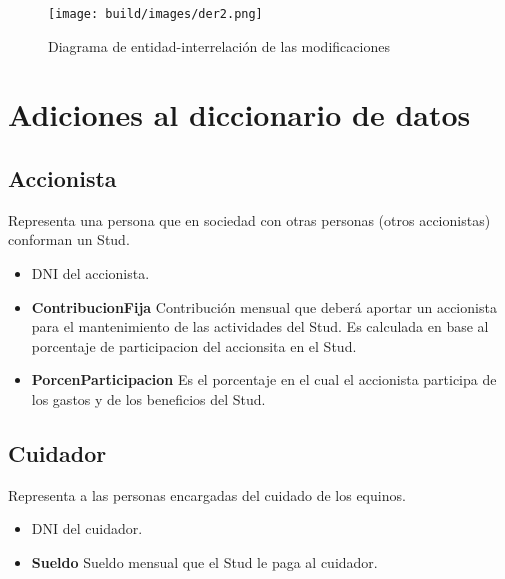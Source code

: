 \documentclass[a4paper,11pt]{article}
\begin{document}
\begin{figure}[h!t]
  \centering
  \texttt{[image: build/images/der2.png]}
  \caption{Diagrama de entidad-interrelación de las modificaciones} \label{fig:der2}
\end{figure}

\FloatBarrier

\section{Adiciones al diccionario de datos}

\subsection{Accionista}

Representa una persona que en sociedad con otras personas (otros accionistas)
conforman un Stud.

\begin{itemize}

  \item \textbf{\uline{}} DNI del accionista.

  \item \textbf{ContribucionFija} Contribución mensual que deberá aportar
    un accionista para el mantenimiento de las actividades del Stud. Es calculada
    en base al porcentaje de participacion del accionsita en el Stud.

  \item \textbf{PorcenParticipacion} Es el porcentaje en el cual el accionista 
  participa de los gastos y de los beneficios del Stud. 

\end{itemize}

\subsection{Cuidador}

Representa a las personas encargadas del cuidado de los equinos.

\begin{itemize}

  \item \textbf{\uline{}} DNI del cuidador.

  \item \textbf{Sueldo} Sueldo mensual que el Stud le paga al cuidador.
  
\end{itemize}
\end{document}

